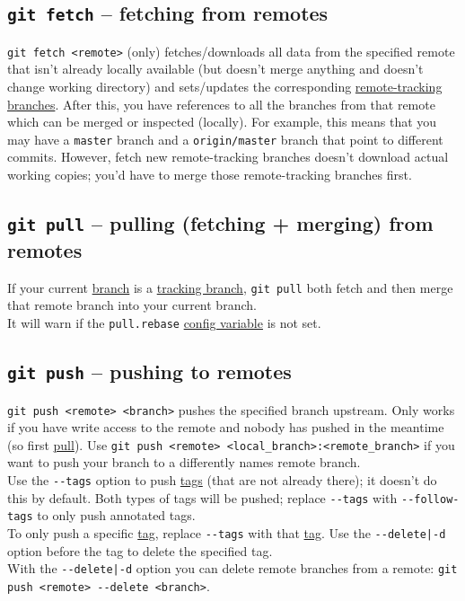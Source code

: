 \documentclass[8pt, table, xcdraw]{article}%
\begin{document}
\subsection{\lstinline{git fetch} -- fetching from remotes} \label{fetch}

\lstinline{git fetch <remote>} (only) fetches/downloads all data from the specified remote that isn't already locally available (but doesn't merge anything and doesn't change working directory) and sets/updates the corresponding \hyperref[remotes]{remote-tracking branches}. After this, you have references to all the branches from that remote which can be merged or inspected (locally). For example, this means that you may have a \lstinline{master} branch and a \lstinline{origin/master} branch that point to different commits. However, fetch new remote-tracking branches doesn't download actual working copies; you'd have to merge those remote-tracking branches first.

\subsection{\lstinline{git pull} -- pulling (fetching + merging) from remotes} \label{pull}

If your current \hyperref[branching]{branch} is a \hyperref[remotes]{tracking branch}, \lstinline{git pull} both fetch and then merge that remote branch into your current branch.\\
It will warn if the \lstinline{pull.rebase} \hyperref[config]{config variable} is not set.

\subsection{\lstinline{git push} -- pushing to remotes} \label{push}

\lstinline{git push <remote> <branch>} pushes the specified branch upstream. Only works if you have write access to the remote and nobody has pushed in the meantime (so first \hyperref[pull]{pull}). Use \lstinline{git push <remote> <local_branch>:<remote_branch>} if you want to push your branch to a differently names remote branch.\\
Use the \lstinline{--tags} option to push \hyperref[tag]{tags} (that are not already there); it doesn't do this by default. Both types of tags will be pushed; replace \lstinline{--tags} with \lstinline{--follow-tags} to only push annotated tags.\\
To only push a specific \hyperref[tag]{tag}, replace \lstinline{--tags} with that \hyperref[tag]{tag}. Use the \lstinline{--delete|-d} option before the tag to delete the specified tag.\\
With the \lstinline{--delete|-d} option you can delete remote branches from a remote: \lstinline{git push <remote> --delete <branch>}.
\end{document}
